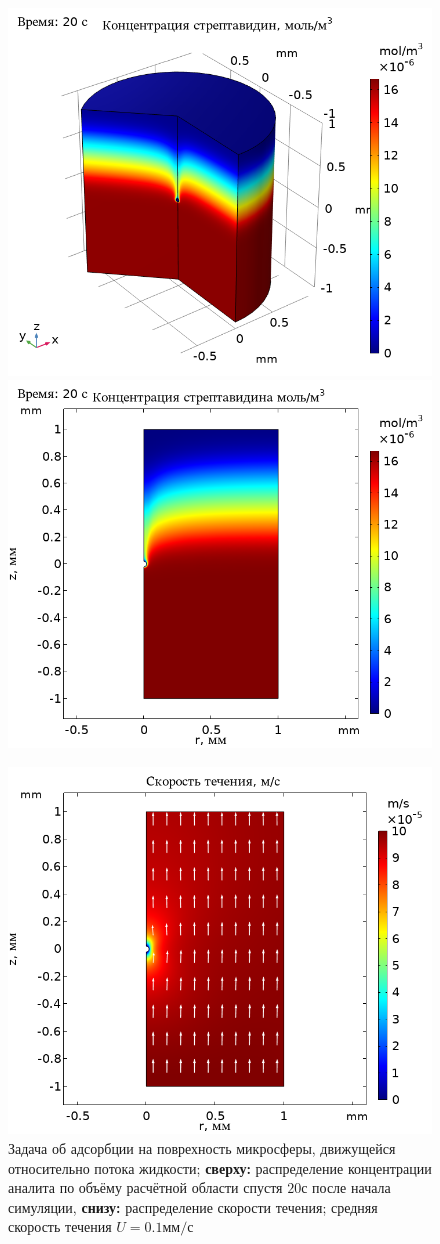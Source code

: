 \documentclass[oneside,final,12pt]{extreport}
\begin{document}
\begin{figure}
  \centering
  \includegraphics[width=.5\textwidth]{pic/sphere_flow_dil100_20s_3d_concentration}%
  \includegraphics[width=.5\textwidth]{pic/sphere_flow_dil100_20s_2d_concentration}

  \includegraphics[width=.6\textwidth]{pic/sphere_flow_dil100_2d_velocity}

  \caption{%
    \label{fig:sphere_flow_concentration_velocity}%
    Задача об адсорбции на поврехность микросферы, движущейся относительно потока жидкости;
    \textbf{сверху:} распределение концентрации аналита по объёму расчётной области
    спустя $20\text{с}$ после начала симуляции,
    \textbf{снизу:} распределение скорости течения;
    средняя скорость течения $U = 0.1\text{мм}/\text{с}$
  }

\end{figure}
\end{document}
